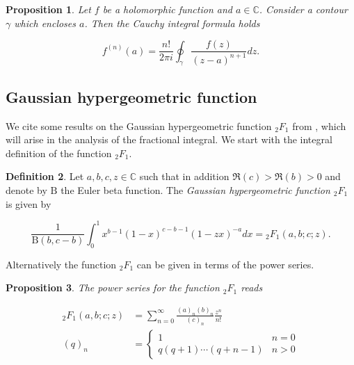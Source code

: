\documentclass[12pt,twoside]{article}
\theoremstyle{plain}
\theoremstyle{plain}
\newtheorem{proposition}{Proposition}[section]
\theoremstyle{definition}
\newtheorem{definition}[proposition]{Definition}
\theoremstyle{remark}
\numberwithin{equation}{section}
\begin{document}
\begin{proposition}
Let $f$ be a holomorphic function and $a \in \mathbb C$. Consider a contour $\gamma$ which encloses $a$. Then the \emph{Cauchy integral formula} holds

\begin{equation}
\label{eq: cauchy integral formula}
f^{(n)}(a)=\frac{n !}{2 \pi i} \oint_{\gamma} \frac{f(z)}{(z-a)^{n+1}} d z.
\end{equation}
\end{proposition}

\subsection{Gaussian hypergeometric function}
\label{sec: hypergeometric function}

We cite some results on the Gaussian hypergeometric function $_2 F_1$ from \cite{BCLO10}, which will arise in the analysis of the fractional integral. We start with the integral definition of the function $_2F_1$. 

\begin{definition}
Let $a,b,c,z\in \mathbb C$ such that in addition $\Re(c)>\Re(b)>0$ and denote by $\mathrm B$ the Euler beta function. The \emph{Gaussian hypergeometric function ${_2 F_1}$} is given by

\begin{equation}
\label{eq: hypergeometric integral definition}
\frac{1}{\mathrm{B}(b, c-b)} \int_{0}^{1} x^{b-1}(1-x)^{c-b-1}(1-z x)^{-a} d x = {_{2} F_{1}}(a, b ; c ; z).
\end{equation}
\end{definition}

Alternatively the function $_2F_1$ can be given in terms of the power series.

\begin{proposition}

The power series for the function $_2F_1$ reads

\begin{equation}
\label{eq: hypergeometric series definition}
\begin{aligned}
_{2} F_{1}(a, b ; c ; z)&=\sum_{n=0}^{\infty} \frac{(a)_{n}(b)_{n}}{(c)_{n}} \frac{z^{n}}{n !} \\[10pt]
(q)_{n}&=\left\{\begin{array}{ll}1 & n=0 \\ q(q+1) \cdots(q+n-1) & n>0\end{array}\right.
\end{aligned}
\end{equation}

\end{proposition}
\end{document}
